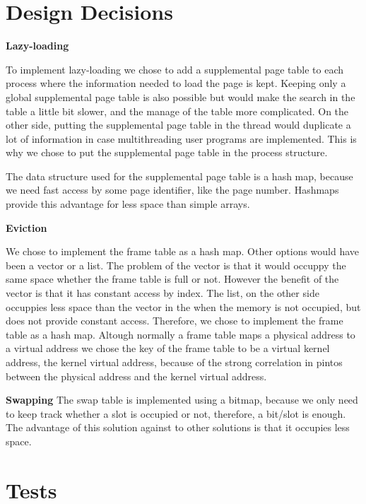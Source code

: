 \begin{lstlisting}

\end{lstlisting}

\section{Design Decisions}

\textbf{Lazy-loading}

To implement lazy-loading we chose to add a supplemental page table to each process where the information needed to load the page is kept. Keeping only a global supplemental page table is also possible but would make the search in the table a little bit slower, and the manage of the table more complicated.
On the other side, putting the supplemental page table in the thread would duplicate a lot of information in case multithreading user programs are implemented. This is why we chose to put the supplemental page table in the process structure.

The data structure used for the supplemental page table is a hash map, because we need fast access by some page identifier, like the page number. Hashmaps provide this advantage for less space than simple arrays.

\textbf{Eviction}

We chose to implement the frame table as a hash map. Other options would have been a vector or a list. The problem of the vector is that it would occuppy the same space whether the frame table is full or not. However the benefit of the vector is that it has constant access by index. The list, on the other side occuppies less space than the vector in the when the memory is not occupied, but does not provide constant access. Therefore, we chose to implement the frame table as a hash map.
Altough normally a frame table maps a physical address to a virtual address we chose the key of the frame table to be a virtual kernel address, the kernel virtual address, because of the strong correlation in pintos between the physical address and the kernel virtual address.

\textbf{Swapping}
The swap table is implemented using a bitmap, because we only need to keep track whether a slot is occupied or not, therefore, a bit/slot is enough. 
The advantage of this solution against to other solutions is that it occupies less space.

\section{Tests}

